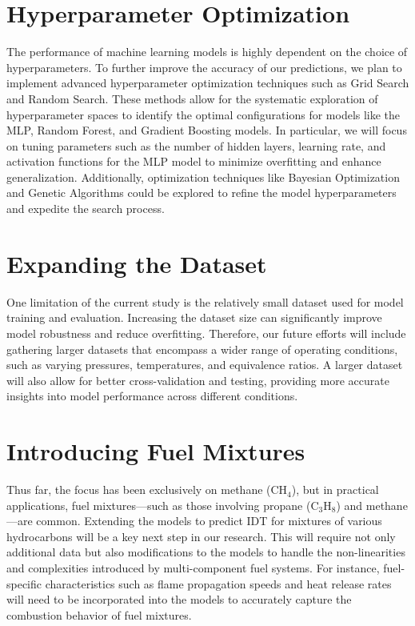 \documentclass[12pt]{report}
\begin{document}
\section{Hyperparameter Optimization}

The performance of machine learning models is highly dependent on the choice of hyperparameters. To further improve the accuracy of our predictions, we plan to implement advanced hyperparameter optimization techniques such as Grid Search and Random Search. These methods allow for the systematic exploration of hyperparameter spaces to identify the optimal configurations for models like the MLP, Random Forest, and Gradient Boosting models. In particular, we will focus on tuning parameters such as the number of hidden layers, learning rate, and activation functions for the MLP model to minimize overfitting and enhance generalization. Additionally, optimization techniques like Bayesian Optimization and Genetic Algorithms could be explored to refine the model hyperparameters and expedite the search process.

\section{Expanding the Dataset}

One limitation of the current study is the relatively small dataset used for model training and evaluation. Increasing the dataset size can significantly improve model robustness and reduce overfitting. Therefore, our future efforts will include gathering larger datasets that encompass a wider range of operating conditions, such as varying pressures, temperatures, and equivalence ratios. A larger dataset will also allow for better cross-validation and testing, providing more accurate insights into model performance across different conditions.

\section{Introducing Fuel Mixtures}

Thus far, the focus has been exclusively on methane (CH\(_4\)), but in practical applications, fuel mixtures—such as those involving propane (C\(_3\)H\(_8\)) and methane—are common. Extending the models to predict IDT for mixtures of various hydrocarbons will be a key next step in our research. This will require not only additional data but also modifications to the models to handle the non-linearities and complexities introduced by multi-component fuel systems. For instance, fuel-specific characteristics such as flame propagation speeds and heat release rates will need to be incorporated into the models to accurately capture the combustion behavior of fuel mixtures.
\end{document}
